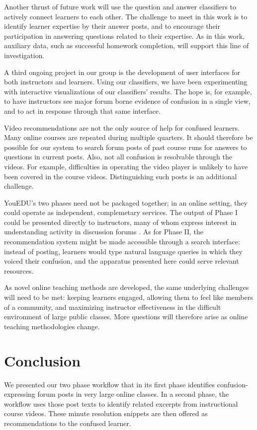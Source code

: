 \documentclass{edm_template}
\begin{document}
Another thrust of future work will use the question and answer
classifiers to actively connect learners to each other. The challenge
to meet in this work is to identify learner expertise by their answer
posts, and to encourage their participation in answering questions
related to their expertise. As in this work, auxiliary data, such as
successful homework completion, will support this line of
investigation.

A third ongoing project in our group is the development of user
interfaces for both instructors and learners. Using our classifiers,
we have been experimenting with interactive visualizations of our
classifiers' results. The hope is, for example, to have instructors
see major forum borne evidence of confusion in a single view, and to
act in response through that same interface.

Video recommendations are not the only source of help for confused
learners. Many online courses are repeated during multiple
quarters. It should therefore be possible for our system to search
forum posts of past course runs for answers to questions in current
posts.  Also, not all confusion is resolvable through the videos. For
example, difficulties in operating the video player is unlikely to
have been covered in the course videos. Distinguishing such posts is
an additional challenge.

YouEDU's two phases need not be packaged together; in an online
setting, they could operate as independent, complemetary services. The
output of Phase I could be presented directly to instructors, many of
whom express interest in understanding activity in discussion forums
\cite{Stephens-Martinez:2014:MMI:2556325.2566246}. As for Phase II,
the recommendation system might be made accessible through a search
interface: instead of posting, learners would type natural language
queries in which they voiced their confusion, and the apparatus
presented here could serve relevant resources.

As novel online teaching methods are developed, the same underlying
challenges will need to be met: keeping learners engaged, allowing
them to feel like members of a community, and maximizing instructor
effectiveness in the difficult environment of large public classes.
More questions will therefore arise as online teaching methodologies
change.

\section{Conclusion}
\label{sec:conclusion}
We presented our two phase workflow that in its first phase identifies
confusion-expressing forum posts in very large online classes. In a
second phase, the workflow uses those post texts to identify related
excerpts from instructional course videos. These minute resolution
snippets are then offered as recommendations to the confused learner.
\end{document}
